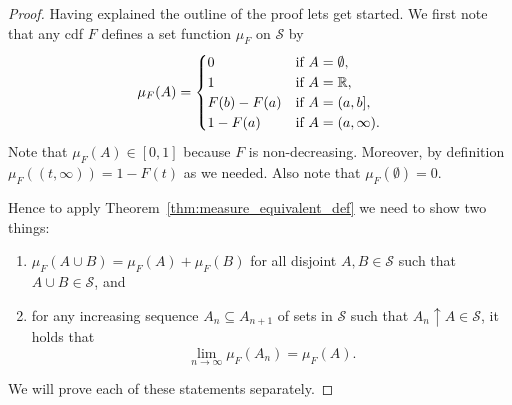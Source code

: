 \begin{proof}
Having explained the outline of the proof lets get started. We first note that any cdf $F$ defines a set function $\mu_F$ on $\mathcal{S}$ by
\[
	\mu_F(A) = \begin{cases}
		0 &\text{if } A = \emptyset,\\
		1 &\text{if } A = \mathbb R,\\
		F(b) - F(a) &\text{if } A = (a,b],\\
		1 - F(a) &\text{if } A = (a, \infty).
	\end{cases}
\]
Note that $\mu_F(A) \in [0,1]$ because $F$ is non-decreasing. Moreover, by definition $\mu_F((t,\infty)) = 1 - F(t)$ as we needed. Also note that $\mu_F(\emptyset) = 0$.


Hence to apply Theorem~\ref{thm:measure_equivalent_def} we need to show two things:
\begin{enumerate}
\item $\mu_F(A \cup B) = \mu_F(A) + \mu_F(B)$ for all disjoint $A,B \in \mathcal{S}$ such that $A \cup B \in \mathcal{S}$, and
\item for any increasing sequence $A_n \subseteq A_{n+1}$ of sets in $\mathcal{S}$ such that $A_n \uparrow A \in \mathcal{S}$, it holds that
\begin{equation}\label{eq:construction_rv_increasing_sequence}
	\lim_{n \to \infty} \mu_F(A_n) = \mu_F(A).
\end{equation}
\end{enumerate}

We will prove each of these statements separately.


\end{proof}
